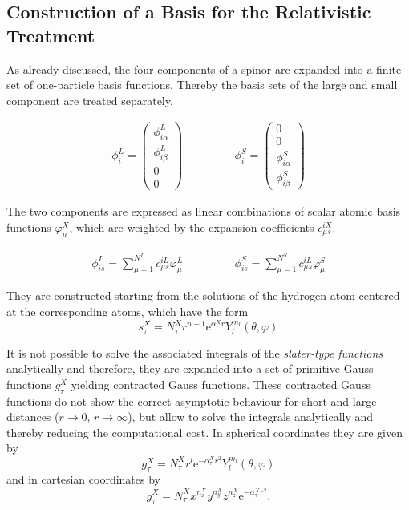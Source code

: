 \subsection{Construction of a Basis for the Relativistic Treatment}\label{basis}
As already discussed, the four components of a spinor are expanded into a finite
set of one-particle basis functions. Thereby the basis sets of the large and small
component are treated separately.

\begin{equation}\begin{array}{ccc}
\phi_i^L = \begin{pmatrix}\phi^L_{i\alpha}\\\phi^L_{i\beta}\\0\\0\end{pmatrix} &\hspace{3em} &\phi_i^S = \begin{pmatrix}0\\0\\\phi^S_{i\alpha}\\\phi^S_{i\beta}\end{pmatrix}
\end{array}\end{equation}

The two components are expressed as linear combinations of scalar atomic
basis functions $\varphi_\mu^X$, which are weighted by the expansion coefficients
$c_{\mu s}^{iX}$.

\begin{equation}\begin{array}{ccc}
\phi^L_{is} = \sum\limits_{\mu=1}^{N^L} c_{\mu s}^{iL} \varphi_\mu^L &\hspace{3em}& \phi^S_{is} = \sum\limits_{\mu=1}^{N^S} c_{\mu s}^{iL} \varphi_\mu^S
\end{array}\end{equation}

They are constructed starting from the solutions of the hydrogen atom centered
at the corresponding atoms, which have the form
\begin{equation}
s_\tau^X = N_\tau^X r^{n-1}\mathrm{e}^{\alpha_\tau^X r}Y_l^{m_l}(\theta,\varphi)
\end{equation}

It is not possible to solve the associated integrals of the \emph{slater-type
functions} analytically and therefore, they are expanded into a set of primitive
Gauss functions $g_\tau^X$ yielding contracted Gauss functions.
These contracted Gauss functions do not show the correct asymptotic behaviour for
short and large distances ($r\rightarrow 0$, $r\rightarrow\infty$), but allow to
solve the integrals analytically and thereby reducing the computational cost.
In spherical coordinates they are given by
\begin{equation}
g_\tau^X = N_\tau^Xr^l\mathrm{e}^{-\alpha_\tau^Xr^2}Y_l^{m_l}(\theta,\varphi)
\end{equation}
and in cartesian coordinates by
\begin{equation}
g_\tau^X = N_\tau^X x^{n_x^X}y^{n_y^X}z^{n_z^X} \mathrm{e}^{-\alpha_\tau^Xr^2}.
\end{equation}


